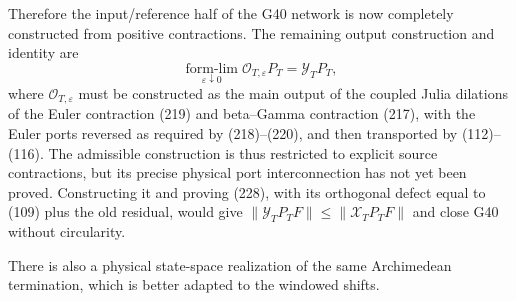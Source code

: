 \documentclass[11pt]{article}
\begin{document}
Therefore the input/reference half of the G40 network is now completely
constructed from positive contractions.  The remaining output construction
and identity are
\begin{equation}
 \boxed{\quad
 \operatorname*{form-lim}_{\varepsilon\downarrow0}
 \mathcal O_{T,\varepsilon}P_T
 =\mathcal Y_TP_T,
 \quad}                                                \tag{228}
\end{equation}
where $\mathcal O_{T,\varepsilon}$ must be constructed as the main output of
the coupled Julia dilations of the Euler contraction (219) and beta--Gamma
contraction (217), with the Euler ports reversed as required by (218)--(220),
and then transported by (112)--(116).  The admissible construction is thus
restricted to explicit source contractions, but its precise physical port
interconnection has not yet been proved.  Constructing it and proving (228),
with its orthogonal defect equal to (109) plus the old residual, would give
$\|\mathcal Y_TP_TF\|\le\|\mathcal X_TP_TF\|$ and close G40 without
circularity.

There is also a physical state-space realization of the same Archimedean
termination, which is better adapted to the windowed shifts.
\end{document}
